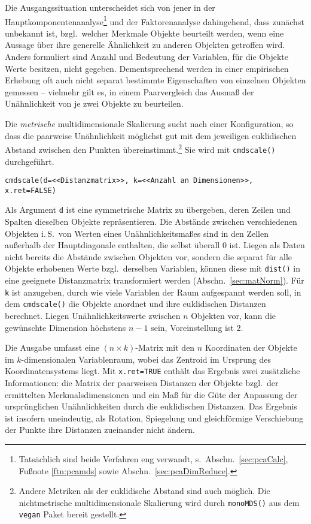 Die Ausgangssituation unterscheidet sich von jener in der Hauptkomponentenanalyse\footnote{Tatsächlich sind beide Verfahren eng verwandt, s.\ Abschn.\ \ref{sec:pcaCalc}, Fußnote \ref{ftn:pcamds} sowie Abschn.\ \ref{sec:pcaDimReduce}.} und der Faktorenanalyse dahingehend, dass zunächst unbekannt ist, bzgl.\ welcher Merkmale Objekte beurteilt werden, wenn eine Aussage über ihre generelle Ähnlichkeit zu anderen Objekten getroffen wird. Anders formuliert sind Anzahl und Bedeutung der Variablen, für die Objekte Werte besitzen, nicht gegeben. Dementsprechend werden in einer empirischen Erhebung oft auch nicht separat bestimmte Eigenschaften von einzelnen Objekten gemessen -- vielmehr gilt es, in einem Paarvergleich das Ausmaß der Unähnlichkeit von je zwei Objekte zu beurteilen.

Die \emph{metrische} multidimensionale Skalierung sucht nach einer Konfiguration, so dass die paarweise Unähnlichkeit möglichst gut mit dem jeweiligen euklidischen Abstand zwischen den Punkten übereinstimmt.\footnote{Andere Metriken als der euklidische Abstand sind auch möglich. Die nichtmetrische multidimensionale Skalierung wird durch \lstinline!monoMDS()! aus dem \lstinline!vegan! Paket \cite{Oksanen2011} bereit gestellt.} Sie wird mit \lstinline!cmdscale()! durchgeführt.
\begin{lstlisting}
cmdscale(d=<<Distanzmatrix>>, k=<<Anzahl an Dimensionen>>, x.ret=FALSE)
\end{lstlisting}

Als Argument \lstinline!d! ist eine symmetrische Matrix zu übergeben, deren Zeilen und Spalten dieselben Objekte repräsentieren. Die Abstände zwischen verschiedenen Objekten i.\,S.\ von Werten eines Unähnlichkeitsmaßes sind in den Zellen außerhalb der Hauptdiagonale enthalten, die selbst überall $0$ ist. Liegen als Daten nicht bereits die Abstände zwischen Objekten vor, sondern die separat für alle Objekte erhobenen Werte bzgl.\ derselben Variablen, können diese mit \lstinline!dist()! in eine geeignete Distanzmatrix transformiert werden (Abschn.\ \ref{sec:matNorm}). Für \lstinline!k! ist anzugeben, durch wie viele Variablen der Raum aufgespannt werden soll, in dem \lstinline!cmdscale()! die Objekte anordnet und ihre euklidischen Distanzen berechnet. Liegen Unähnlichkeitswerte zwischen $n$ Objekten vor, kann die gewünschte Dimension höchstens $n-1$ sein, Voreinstellung ist $2$.

Die Ausgabe umfasst eine $(n \times k)$-Matrix mit den $n$ Koordinaten der Objekte im $k$-dimensionalen Variablenraum, wobei das Zentroid im Ursprung des Koordinatensystems liegt. Mit \lstinline!x.ret=TRUE! enthält das Ergebnis zwei zusätzliche Informationen: die Matrix der paarweisen Distanzen der Objekte bzgl.\ der ermittelten Merkmalsdimensionen und ein Maß für die Güte der Anpassung der ursprünglichen Unähnlichkeiten durch die euklidischen Distanzen. Das Ergebnis ist insofern uneindeutig, als Rotation, Spiegelung und gleichförmige Verschiebung der Punkte ihre Distanzen zueinander nicht ändern.


